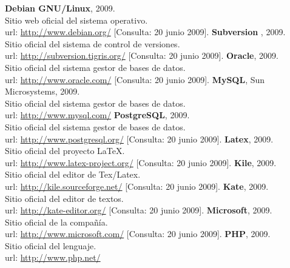 \begin{thebibliography}{xx}

 \textbf{Debian GNU/Linux}, 2009.\\
         Sitio web oficial del sistema operativo.\\
         url: \url{http://www.debian.org/}
         [Consulta: 20 junio 2009].
 \textbf{Subversion} , 2009.\\
         Sitio oficial del sistema de control de versiones.\\
         url: \url{http://subversion.tigris.org/}
         [Consulta: 20 junio 2009].
 \textbf{Oracle}, 2009.\\
         Sitio oficial del sistema gestor de bases de datos.\\
         url: \url{http://www.oracle.com/}
         [Consulta: 20 junio 2009].
 \textbf{MySQL}, Sun Microsystems, 2009.\\
         Sitio oficial del sistema gestor de bases de datos.\\
         url: \url{http://www.mysql.com/}
 \textbf{PostgreSQL}, 2009.\\
         Sitio oficial del sistema gestor de bases de datos.\\
         url: \url{http://www.postgresql.org/}
         [Consulta: 20 junio 2009].
 \textbf{Latex}, 2009.\\
         Sitio oficial del proyecto \LaTeX.\\
         url: \url{http://www.latex-project.org/}
         [Consulta: 20 junio 2009].
 \textbf{Kile}, 2009.\\
         Sitio oficial del editor de Tex/Latex.\\
         url: \url{http://kile.sourceforge.net/}
         [Consulta: 20 junio 2009].
 \textbf{Kate}, 2009.\\
         Sitio oficial del editor de textos.\\
         url: \url{http://kate-editor.org/}
         [Consulta: 20 junio 2009].
 \textbf{Microsoft}, 2009.\\
         Sitio oficial de la compañía.\\
         url: \url{http://www.microsoft.com/}
         [Consulta: 20 junio 2009].
 \textbf{PHP}, 2009.\\
         Sitio oficial del lenguaje.\\
         url: \url{http://www.php.net/}

\end{thebibliography}
